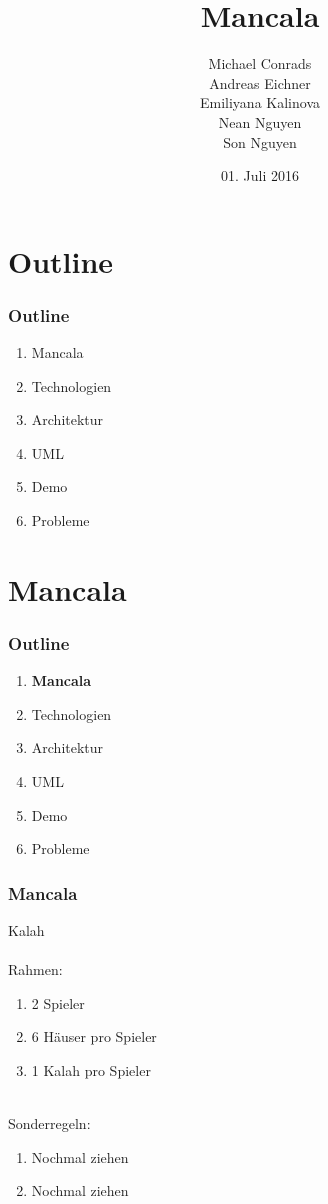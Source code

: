 \documentclass[
	10pt,
	t		%
]{beamer}
\title{Mancala}
\subtitle{}
\author{Michael Conrads \\ Andreas Eichner \\ Emiliyana Kalinova \\ Nean Nguyen \\ Son Nguyen}
\date{01. Juli 2016}
\begin{document}
\AddToShipoutPicture{\TitlePicture}
\maketitle
\ClearShipoutPicture
\AddToShipoutPicture{\BackgroundPicture}

\section{Outline}
\begin{frame}
\frametitle{Outline}
\begin{enumerate}
\item Mancala
\item Technologien
\item Architektur
\item UML
\item Demo
\item Probleme
\end{enumerate}
\end{frame}

\section{Mancala}
\begin{frame}
\frametitle{Outline}
\begin{enumerate}
\item \textbf{Mancala}
\item Technologien
\item Architektur
\item UML
\item Demo
\item Probleme
\end{enumerate}
\end{frame}

\begin{frame}
\frametitle{Mancala}
Kalah\\[0.2cm]
\hfill \\
Rahmen:
\begin{enumerate}
	\item 2 Spieler
	\item 6 H\"auser pro Spieler
	\item 1 Kalah pro Spieler
\end{enumerate}
\hfill \\[0.5cm]
Sonderregeln:
\begin{enumerate}
	\item Nochmal ziehen
	\item Nochmal ziehen
\end{enumerate}
\end{frame}
\end{document}
